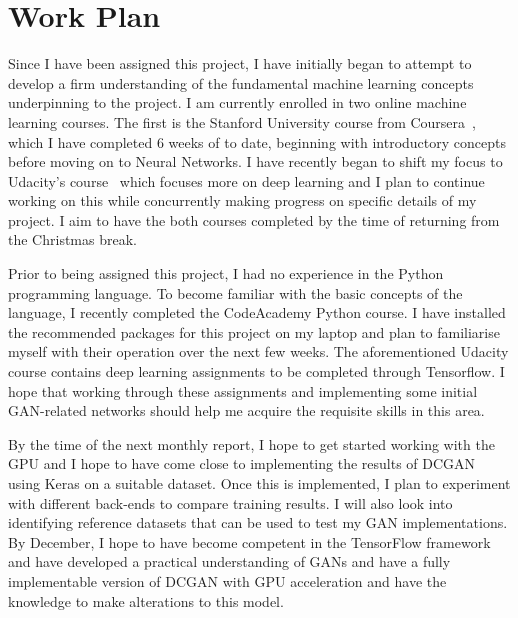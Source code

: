 \documentclass[]{monthly-report}
\begin{document}

\def\studentname{David Hayes}
\def\projecttitle{Learning Signal Feature Representation using Generative Adversarial Networks}
\def\ucdstudentnumber{\hl{13508113}}
\def\monthlyreportnumber{\hl{1}}
\maketitle


\section{Work Plan}

Since I have been assigned this project, I have initially began to attempt to develop a firm understanding of the fundamental machine learning concepts underpinning to the project. I am currently enrolled in two online machine learning courses. The first is the Stanford University course from Coursera~\cite{Ng-Coursera-2016}, which I have completed 6 weeks of to date, beginning with introductory concepts before moving on to Neural Networks. I have recently began to shift my focus to Udacity's course~\cite{VincentVanhoucke-Udacity-2016} which focuses more on deep learning and I plan to continue working on this while concurrently making progress on specific details of my project. I aim to have the both courses completed by the time of returning from the Christmas break.

Prior to being assigned this project, I had no experience in the Python programming language. To become familiar with the basic concepts of the language, I recently completed the CodeAcademy Python course. I have installed the recommended packages for this project on my laptop and plan to familiarise myself with their operation over the next few weeks. The aforementioned Udacity course contains deep learning assignments to be completed through Tensorflow.  I hope that working through these assignments and implementing some initial GAN-related networks should help me acquire the requisite skills in this area.

By the time of the next monthly report, I hope to get started working with the GPU and I hope to have come close to implementing the results of DCGAN~\cite{DCGAN2015} using Keras on a suitable dataset. Once this is implemented, I plan to experiment with different back-ends to compare training results. I will also look into identifying reference datasets that can be used to test my GAN implementations. By December, I hope to have become competent in the TensorFlow framework and have developed a practical understanding of GANs and have a fully implementable version of DCGAN with GPU acceleration and have the knowledge to make alterations to this model.
\end{document}
